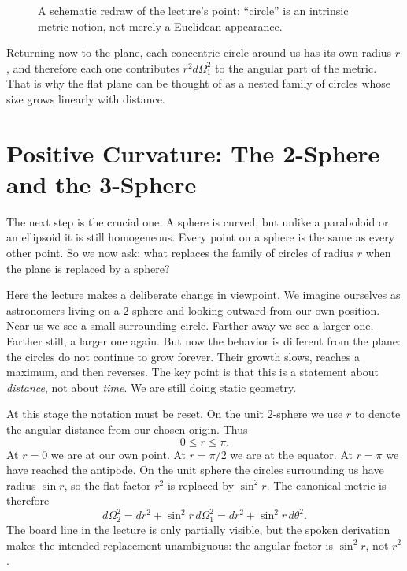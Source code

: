 \begin{figure}[htbp]
\centering
{}
\caption{A schematic redraw of the lecture's point: ``circle'' is an intrinsic metric notion, not merely a Euclidean appearance.}
\end{figure}

Returning now to the plane, each concentric circle around us has its own radius \(r\), and therefore each one contributes \(r^2 d\Omega_1^2\) to the angular part of the metric. That is why the flat plane can be thought of as a nested family of circles whose size grows linearly with distance.

\section{Positive Curvature: The 2-Sphere and the 3-Sphere}

The next step is the crucial one. A sphere is curved, but unlike a paraboloid or an ellipsoid it is still homogeneous. Every point on a sphere is the same as every other point. So we now ask: what replaces the family of circles of radius \(r\) when the plane is replaced by a sphere?

Here the lecture makes a deliberate change in viewpoint. We imagine ourselves as astronomers living on a \(2\)-sphere and looking outward from our own position. Near us we see a small surrounding circle. Farther away we see a larger one. Farther still, a larger one again. But now the behavior is different from the plane: the circles do not continue to grow forever. Their growth slows, reaches a maximum, and then reverses. The key point is that this is a statement about \emph{distance}, not about \emph{time}. We are still doing static geometry.

At this stage the notation must be reset. On the unit \(2\)-sphere we use \(r\) to denote the angular distance from our chosen origin. Thus
\[
0 \le r \le \pi.
\]
At \(r=0\) we are at our own point. At \(r=\pi/2\) we are at the equator. At \(r=\pi\) we have reached the antipode. On the unit sphere the circles surrounding us have radius \(\sin r\), so the flat factor \(r^2\) is replaced by \(\sin^2 r\). The canonical metric is therefore
\begin{equation}
d\Omega_2^2 = dr^2 + \sin^2 r\, d\Omega_1^2
           = dr^2 + \sin^2 r\, d\theta^2.
\end{equation}
The board line in the lecture is only partially visible, but the spoken derivation makes the intended replacement unambiguous: the angular factor is \(\sin^2 r\), not \(r^2\).

